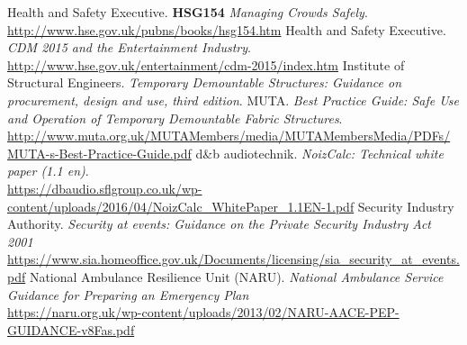 \begin{thebibliography}{18}
    Health and Safety Executive.
    \textbf{HSG154} \textit{Managing Crowds Safely}. \\
    \href{http://www.hse.gov.uk/pubns/books/hsg154.htm}{http://www.hse.gov.uk/pubns/books/hsg154.htm}
    Health and Safety Executive.
    \textit{CDM 2015 and the Entertainment Industry}. \\
    \href{http://www.hse.gov.uk/entertainment/cdm-2015/index.htm}{http://www.hse.gov.uk/entertainment/cdm-2015/index.htm}
    Institute of Structural Engineers.
    \textit{Temporary Demountable Structures: Guidance on procurement, design and use, third edition}.
    MUTA.
    \textit{Best Practice Guide: Safe Use and Operation of Temporary Demountable Fabric Structures}. \\
    \href{http://www.muta.org.uk/MUTAMembers/media/MUTAMembersMedia/PDFs/MUTA-s-Best-Practice-Guide.pdf}{http://www.muta.org.uk/MUTAMembers/media/MUTAMembersMedia/PDFs/MUTA-s-Best-Practice-Guide.pdf}
    d\&b audiotechnik.
        \textit{NoizCalc: Technical white paper (1.1 en)}. \\
    \href{https://dbaudio.sflgroup.co.uk/wp-content/uploads/2016/04/NoizCalc_WhitePaper_1.1EN-1.pdf}{https://dbaudio.sflgroup.co.uk/wp-content/uploads/2016/04/NoizCalc\_WhitePaper\_1.1EN-1.pdf}
    Security Industry Authority.
        \textit{Security at events: Guidance on the Private Security Industry Act 2001} \\
    \href{https://www.sia.homeoffice.gov.uk/Documents/licensing/sia\_security\_at\_events.pdf}{https://www.sia.homeoffice.gov.uk/Documents/licensing/sia\_security\_at\_events.pdf}
    National Ambulance Resilience Unit (NARU).
    \textit{National Ambulance Service Guidance for Preparing an Emergency Plan} \\
    \href{https://naru.org.uk/wp-content/uploads/2013/02/NARU-AACE-PEP-GUIDANCE-v8Fas.pdf}{https://naru.org.uk/wp-content/uploads/2013/02/NARU-AACE-PEP-GUIDANCE-v8Fas.pdf}
\end{thebibliography}
